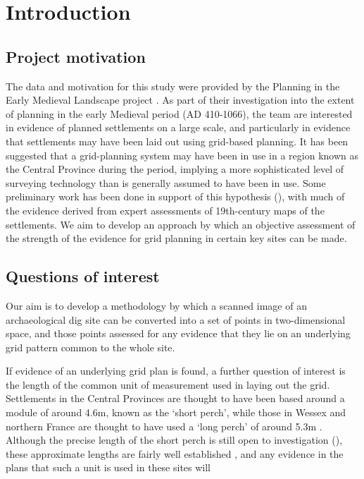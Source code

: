\documentclass[../../ArchStats.tex]{subfiles}
\begin{document}
\section{Introduction}

\subsection{Project motivation}
The data and motivation for this study were provided by the Planning in the Early Medieval Landscape project \cite{PEML}. As part of their investigation into the extent of planning in the early Medieval period (AD 410-1066), the team are interested in evidence of planned settlements on  a large scale, and particularly in evidence that settlements may have been laid out using grid-based planning. It has been suggested that a grid-planning system may have been in use in a region known as the Central Province during the period, implying a more sophisticated level of surveying technology than is generally assumed to have been in use. Some preliminary work has been done in support of this hypothesis (\cite{Blair2013}), with much of the evidence derived from expert assessments of 19th-century maps of the settlements. We aim to develop an approach by which an objective assessment of the strength of the evidence for grid planning in certain key sites can be made.


\subsection{Questions of interest}
Our aim is to develop a methodology by which a scanned image of an archaeological dig site  can be converted into a set of points in two-dimensional space, and those points assessed for any evidence that they lie on an underlying grid pattern common to the whole site. 

If evidence of an underlying grid plan is found, a further question of interest is the length of the common unit of measurement used in laying out the grid. Settlements in the Central Provinces are thought to have been based around a module of around 4.6m, known as the `short perch', while those in Wessex and northern France are thought to have used a `long perch' of around 5.3m . Although the precise length of the short perch is still open to investigation (\cite{Kendall2013}), these approximate lengths are fairly well established , and any evidence in the plans that such a unit is used in these sites will 
\end{document}
